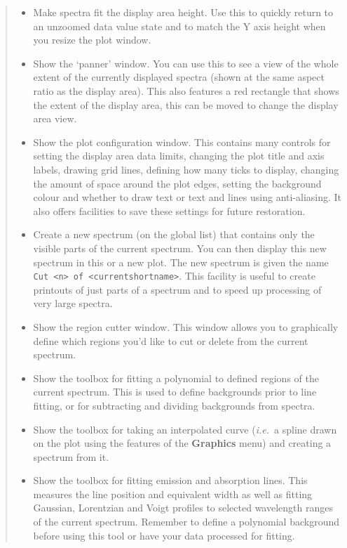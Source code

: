 \documentclass[twoside,11pt]{article}
\newcommand{\htmladdimg}[1]{}
\newcommand{\latexhtml}[2]{#1}
\renewcommand{\_}{\texttt{\symbol{95}}}
\newcommand{\inline}[1]
        {\latexhtml{\texttt{[image: sun243\_figures/\#1.eps]}}
        {\htmladdimg[align=center]{#1.gif}}}
\newcommand{\labelitem}[1]{\textbf{#1}}
\newcommand{\hitext}[1]{\texttt{#1}}
\newcommand{\ie}{\textit{i.e.}}
\begin{document}
\begin{quote}
\begin{itemize}
  \item[\inline{fitheight}] Make spectra fit the display area height.  Use
  this to quickly return to an unzoomed data value state and to match the Y
  axis height when you resize the plot window.

  \item[\inline{panner}] Show the `panner' window. You can use this to
  see a view of the whole extent of the currently displayed spectra
  (shown at the same aspect ratio as the display area). This also
  features a red rectangle that shows the extent of the display area,
  this can be moved to change the display area view.

  \item[\inline{config}] Show the plot configuration window. This
  contains many controls for setting the display area data limits,
  changing the plot title and axis labels, drawing grid lines,
  defining how many ticks to display, changing the amount of space
  around the plot edges, setting the background colour and whether to
  draw text or text and lines using anti-aliasing. It also offers
  facilities to save these settings for future restoration.

  \item[\inline{cutter}] Create a new spectrum (on the global list)
  that contains only the visible parts of the current spectrum. You
  can then display this new spectrum in this or a new plot. The new
  spectrum is given the name \hitext{Cut <n> of <current\_shortname>}.
  This facility is useful to create printouts of just parts of a
  spectrum and to speed up processing of very large spectra.

  \item[\inline{regioncutter}] Show the region cutter window. This
  window allows you to graphically define which regions you'd like to
  cut or delete from the current spectrum.

  \item[\inline{fitback}] Show the toolbox for fitting a polynomial to
  defined regions of the current spectrum. This is used to define
  backgrounds prior to line fitting, or for subtracting and dividing
  backgrounds from spectra.

  \item[\inline{interpolate}] Show the toolbox for taking an interpolated
  curve (\ie\ a spline drawn on the plot using the features of the
  \labelitem{Graphics} menu) and creating a spectrum from it.

  \item[\inline{fitline}] Show the toolbox for fitting emission and absorption
  lines. This measures the line position and equivalent width as well as
  fitting Gaussian, Lorentzian and Voigt profiles to selected wavelength
  ranges of the current spectrum. Remember to define a polynomial background
  before using this tool or have your data processed for fitting.


\end{itemize}
\end{quote}
\end{document}
